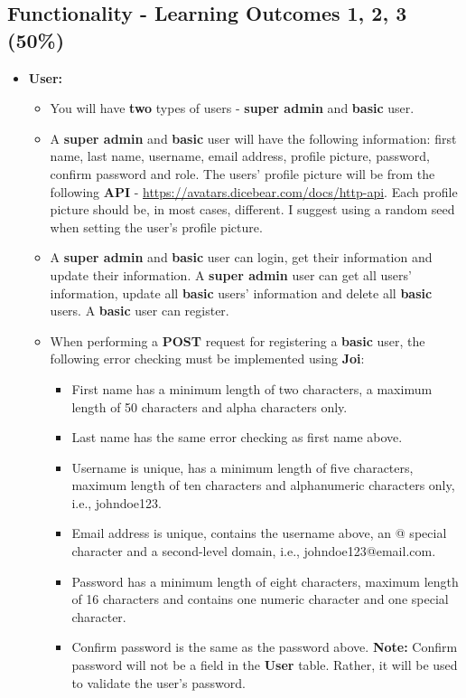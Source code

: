\documentclass{article}
\begin{document}
\subsection*{Functionality - Learning Outcomes 1, 2, 3 (50\%)}
\begin{itemize}
	\item \textbf{User:}
	\begin{itemize}
		\item You will have \textbf{two} types of users - \textbf{super admin} and \textbf{basic} user.
		\item A \textbf{super admin} and \textbf{basic} user will have the following information: first name, last name, username, email address, profile picture, password, confirm password and role. The users' profile picture will be from the following \textbf{API} - \href{https://avatars.dicebear.com/docs/http-api}{https://avatars.dicebear.com/docs/http-api}. Each profile picture should be, in most cases, different. I suggest using a random seed when setting the user's profile picture.
		\item A \textbf{super admin} and \textbf{basic} user can login, get their information and update their information. A \textbf{super admin} user can get all users' information, update all \textbf{basic} users' information and delete all \textbf{basic} users. A \textbf{basic} user can register.
		\item When performing a \textbf{POST} request for registering a \textbf{basic} user, the following error checking must be implemented using \textbf{Joi}:
		\begin{itemize}
			\item First name has a minimum length of two characters, a maximum length of 50 characters and alpha characters only.
			\item Last name has the same error checking as first name above.
			\item Username is unique, has a minimum length of five characters, maximum length of ten characters and alphanumeric characters only, i.e., johndoe123.
			\item Email address is unique, contains the username above, an @ special character and a second-level domain, i.e., johndoe123@email.com.
			\item Password has a minimum length of eight characters, maximum length of 16 characters and contains one numeric character and one special character.
			\item Confirm password is the same as the password above. \textbf{Note:} Confirm password will not be a field in the \textbf{User} table. Rather, it will be used to validate the user's password.

\end{itemize}
\end{itemize}
\end{itemize}
\end{document}
